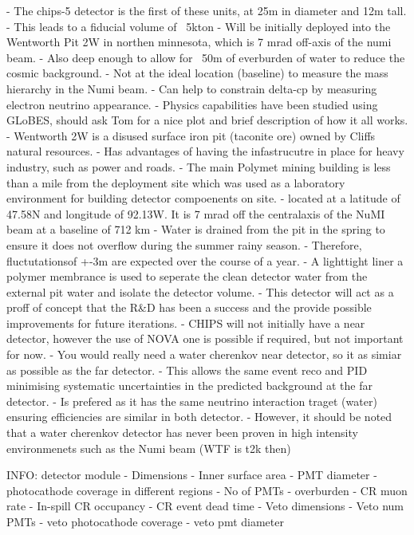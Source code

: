 - The chips-5 detector is the first of these units, at 25m in diameter and 12m tall.
- This leads to a fiducial volume of ~5kton
- Will be initially deployed into the Wentworth Pit 2W in northen minnesota, which is 7 mrad
off-axis of the numi beam.
- Also deep enough to allow for ~50m of everburden of water to reduce the cosmic background.
- Not at the ideal location (baseline) to measure the mass hierarchy in the Numi beam.
- Can help to constrain delta-cp by measuring electron neutrino appearance.
- Physics capabilities have been studied using GLoBES, should ask Tom for a nice plot and brief
description of how it all works.
- Wentworth 2W is a disused surface iron pit (taconite ore) owned by Cliffs natural resources.
- Has advantages of having the infastrucutre in place for heavy industry, such as power and roads.
- The main Polymet mining building is less than a mile from the deployment site which was used as
a laboratory environment for building detector compoenents on site.
- located at a latitude of 47.58N and longitude of 92.13W. It is 7 mrad off the centralaxis of the
NuMI beam at a baseline of 712 km
- Water is drained from the pit in the spring to ensure it does not overflow during the summer
rainy season.
- Therefore, fluctutationsof +-3m are expected over the course of a year.
- A lighttight liner a polymer membrance is used to seperate the clean detector water from the
external pit water and isolate the detector volume.
- This detector will act as a proff of concept that the R\&D has been a success and the provide
possible improvements for future iterations.
- CHIPS will not initially have a near detector, however the use of NOVA one is possible if
required, but not important for now.
- You would really need a water cherenkov near detector, so it as simiar as possible as the far
detector.
- This allows the same event reco and PID minimising systematic uncertainties in the predicted
background at the far detector.
- Is prefered as it has the same neutrino interaction traget (water) ensuring efficiencies are
similar in both detector.
- However, it should be noted that a water cherenkov detector has never been proven in high
intensity environmenets such as the Numi beam (WTF is t2k then)

INFO: detector module
- Dimensions
- Inner surface area
- PMT diameter
- photocathode coverage in different regions
- No of PMTs
- overburden
- CR muon rate
- In-spill CR occupancy
- CR event dead time
- Veto dimensions
- Veto num PMTs
- veto photocathode coverage
- veto pmt diameter

